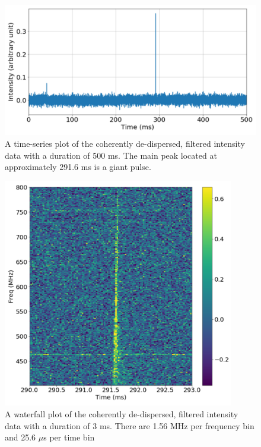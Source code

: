 \documentclass{article}
\begin{document}
\begin{figure}[h!]
  \centering
  \includegraphics[width=1.0\textwidth]{ts_500ms.pdf}
  \caption{A time-series plot of the coherently de-dispersed, filtered intensity data with a duration of 500 ms. The main peak located at approximately 291.6 ms is a giant pulse.}
\end{figure}
\begin{figure}[H]
  \centering
  \includegraphics[width=0.9\textwidth]{wf_3ms.pdf}
  \caption{A waterfall plot of the coherently de-dispersed, filtered intensity data with a duration of 3 ms. There are 1.56 MHz per frequency bin and 25.6 $\mu$s per time bin}
\end{figure}
\end{document}
